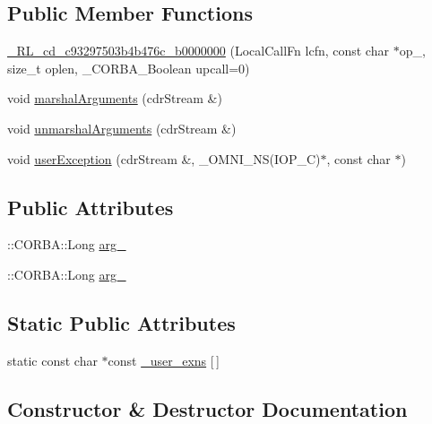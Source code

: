\subsection*{Public Member Functions}
\begin{DoxyCompactItemize}
\item 
\hyperlink{class__0_r_l__cd__c93297503b4b476c__b0000000_ac1cdd4fa506f30d39864cc6494deffc7}{\+\_\+R\+L\+\_\+cd\+\_\+c93297503b4b476c\+\_\+b0000000} (Local\+Call\+Fn lcfn, const char $\ast$op\+\_\+, size\+\_\+t oplen, \+\_\+\+C\+O\+R\+B\+A\+\_\+\+Boolean upcall=0)
\item 
void \hyperlink{class__0_r_l__cd__c93297503b4b476c__b0000000_a5226a30e633968374c01cfb591480fde}{marshal\+Arguments} (cdr\+Stream \&)
\item 
void \hyperlink{class__0_r_l__cd__c93297503b4b476c__b0000000_a190389d98b14853f4e10da3b7c7dbce6}{unmarshal\+Arguments} (cdr\+Stream \&)
\item 
void \hyperlink{class__0_r_l__cd__c93297503b4b476c__b0000000_a0f138774eeeb7ecad8f9d98186941e2c}{user\+Exception} (cdr\+Stream \&, \+\_\+\+O\+M\+N\+I\+\_\+\+NS(I\+O\+P\+\_\+C)$\ast$, const char $\ast$)
\end{DoxyCompactItemize}
\subsection*{Public Attributes}
\begin{DoxyCompactItemize}
\item 
\+::C\+O\+R\+B\+A\+::\+Long \hyperlink{class__0_r_l__cd__c93297503b4b476c__b0000000_ae90df0f02cbdd0ef4f1add610ebd2118}{arg\+\_}
\item 
\+::C\+O\+R\+B\+A\+::\+Long \hyperlink{class__0_r_l__cd__c93297503b4b476c__b0000000_a02271bbb9282eb05747774e2e14e7ffb}{arg\+\_}
\end{DoxyCompactItemize}
\subsection*{Static Public Attributes}
\begin{DoxyCompactItemize}
\item 
static const char $\ast$const \hyperlink{class__0_r_l__cd__c93297503b4b476c__b0000000_a03a219aaf4b2d7bcc60274a72583f9d8}{\+\_\+user\+\_\+exns} \mbox{[}$\,$\mbox{]}
\end{DoxyCompactItemize}


\subsection{Constructor \& Destructor Documentation}
